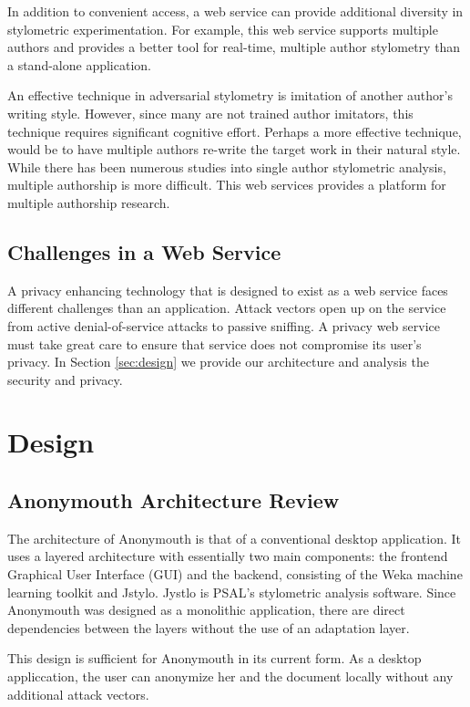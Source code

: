 \documentclass[letterpaper]{article}
\begin{document}
In addition to convenient access, a web service can provide additional
diversity in stylometric experimentation.  For example, this web
service supports multiple authors and provides a better tool for
real-time, multiple author stylometry than a stand-alone application.

An effective technique in adversarial stylometry is imitation of
another author's writing style.  However, since many are not trained
author imitators, this technique requires significant cognitive effort.
Perhaps a more effective technique, would be to have multiple authors
re-write the target work in their natural style.  While there has been
numerous studies into single author stylometric analysis, multiple
authorship is more difficult.  This web services provides a platform
for multiple authorship research.

\subsection{Challenges in a Web Service}

A privacy enhancing technology that is designed to exist as a web
service faces different challenges than an application.  Attack
vectors open up on the service from active denial-of-service attacks
to passive sniffing.  A privacy web service must take great care to
ensure that service does not compromise its user's privacy.  In
Section \ref{sec:design} we provide our architecture and analysis the
security and privacy.

\section{Design}

\subsection{Anonymouth Architecture Review}

The architecture of Anonymouth is that of a conventional desktop
application.  It uses a layered architecture with essentially two main
components: the frontend Graphical User Interface (GUI) and the
backend, consisting of the Weka machine learning toolkit and Jstylo.
Jystlo is PSAL's stylometric analysis software.   Since Anonymouth was
designed as a monolithic application, there are direct dependencies
between the layers without the use of an adaptation layer.

This design is sufficient for Anonymouth in its current form.  As a
desktop appliccation, the user can anonymize her and the document
locally without any additional attack vectors.
\end{document}
